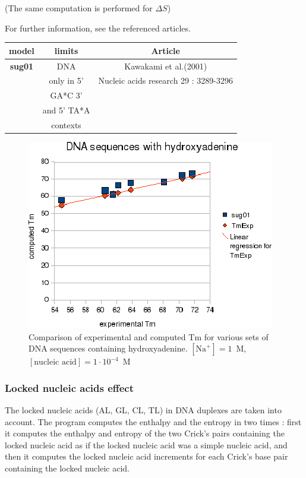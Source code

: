 \documentclass{article}
\begin{document}
       (The same computation is performed for $\Delta S$) 
       
For further information, see the referenced articles.

\begin{table}[hc]
\begin{tabular}[h]{| c | c | c |}
\textbf{model} & \textbf{limits} & \textbf{Article} \\
\hline
\textbf{sug01} & DNA & Kawakami et al.(2001)\\
 & only in 5' & Nucleic acids research 29 : 3289-3296\\
 & GA*C 3' & \\
 & and 5' TA*A & \\
 & contexts & \\
 \hline
\end{tabular}
\end{table}

\begin{figure}[h]
\includegraphics[width=1\linewidth]{images/Hydroxyadenine}
\caption{Comparison of experimental and computed Tm for various sets of
 DNA sequences containing hydroxyadenine. $[\mbox{Na}^+] = 1$~M, $[\mbox{nucleic acid}] = 1\cdot{}10^{-4}$~M}
\end{figure}

\subsubsection{Locked nucleic acids effect}

The locked nucleic acids (AL, GL, CL, TL) in DNA duplexes are taken into account.
The program computes the enthalpy and the entropy in two times : first it computes the enthalpy and entropy of 
the two Crick's pairs containing the locked nucleic acid as if the locked nucleic acid was a simple nucleic acid,
and then it computes the locked nucleic acid increments for each Crick's base pair containing the locked nucleic acid.
\end{document}
